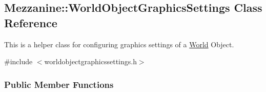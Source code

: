 \hypertarget{classMezzanine_1_1WorldObjectGraphicsSettings}{
\subsection{Mezzanine::WorldObjectGraphicsSettings Class Reference}
\label{classMezzanine_1_1WorldObjectGraphicsSettings}
}


This is a helper class for configuring graphics settings of a \hyperlink{classMezzanine_1_1World}{World} Object.  




{\ttfamily \#include $<$worldobjectgraphicssettings.h$>$}

\subsubsection*{Public Member Functions}
